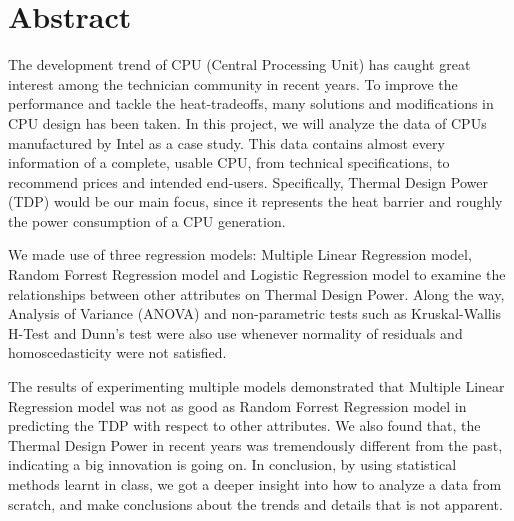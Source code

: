 %
%
%   
\setcounter{section}{-1}
\section{Abstract}

The development trend of CPU (Central Processing Unit) has caught great interest among the technician
community in recent years. To improve the performance and tackle the heat-tradeoffs, many solutions
and modifications in CPU design has been taken. In this project, we will analyze the data of CPUs
manufactured by Intel as a case study. This data contains almost every information of a complete, usable
CPU, from technical specifications, to recommend prices and intended end-users. Specifically, Thermal Design Power (TDP)
would be our main focus, since it represents the heat barrier and roughly the power consumption of a CPU generation.

We made use of three regression models: Multiple Linear Regression model, Random Forrest Regression model and Logistic Regression
model to examine the relationships between other attributes on Thermal Design Power. Along the way, Analysis of Variance (ANOVA) and
non-parametric tests such as Kruskal-Wallis H-Test and Dunn's test were also use whenever normality of residuals and homoscedasticity
were not satisfied. 

The results of experimenting multiple models demonstrated that Multiple Linear Regression model was not as good as 
Random Forrest Regression model in predicting the TDP with respect to other attributes. We also found that, the Thermal Design Power in
recent years was tremendously different from the past, indicating a big innovation is going on. In conclusion, by using statistical methods
learnt in class, we got a deeper insight into how to analyze a data from scratch, and make conclusions about the trends and details that is
not apparent.